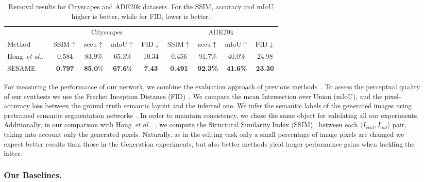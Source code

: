 \documentclass[runningheads]{llncs}
\makeatletter
\DeclareRobustCommand\onedot{\futurelet\@let@token\@onedot}
\def\@onedot{\ifx\@let@token.\else.\null\fi\xspace}
\def\etal{\emph{et al}\onedot}
\def\hong{Hong~\etal~\cite{hong2018learning}}
\makeatother
\begin{document}
\begin{table}[t]
\begin{center}
\caption{Removal results for Cityscapes and ADE20k datasets. For the SSIM, accuracy and mIoU higher is better, while for FID, lower is better.}
\label{table:removal}
\begin{tabular}{l|cccc|cccc}
\multicolumn{1}{l}{} &  \multicolumn{4}{c}{Cityscapes} & \multicolumn{4}{c}{ADE20k} \\
\cline{2-9}
Method & SSIM$\uparrow$ & accu$\uparrow$  & mIoU$\uparrow$  & FID$\downarrow$  & SSIM$\uparrow$  & accu$\uparrow$  & mIoU$\uparrow$   & FID$\downarrow$  \\
\hline
\hong{} & 0.584 & 83.9\% & 65.3\% & 10.34 &  0.456  & 91.7\% & 40.0\% &  24.98  \\
SESAME & \textbf{0.797} & \textbf{85.0}\% & \textbf{67.6}\% & \textbf{7.43}  & \textbf{0.491} & \textbf{92.3\%} & \textbf{41.6\%} &  \textbf{23.30} \\
\end{tabular}
\end{center}

\end{table}

For measuring the performance of our network, we combine the evaluation approach of previous methods~\cite{hong2018learning,park2019SPADE}.
To assess the perceptual quality of our synthesis we use the Frechet Inception Distance (FID)~\cite{NIPS2017_7240}.
We compare the mean Intersection over Union (mIoU), and the pixel-accuracy loss between the ground truth semantic layout and the inferred one. We infer the semantic labels of the generated images using pretrained semantic segmentation networks~\cite{Yu2016,Yu2017,zhou2016semantic,zhou2017scene}.
In order to maintain consistency, we chose the same object for validating all our experiments.
Additionally, in our comparison with \hong{}, 
we compute the Structural Similarity Index (SSIM)~\cite{wang2004image} between each $\langle I_{real}, I_{out} \rangle$ pair, taking into account only the generated pixels.
Naturally, as in the editing task only a small percentage of image pixels are changed we expect better results than those in the Generation experiments, but also better methods yield larger performance gains when tackling the latter.

\subsubsection{Our Baselines.}
\label{ssc:baseline}
\end{document}
